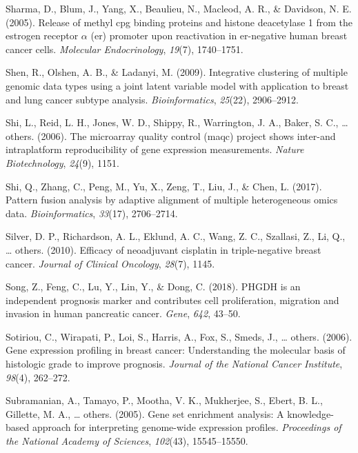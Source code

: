 \documentclass[12pt,twoside]{reedthesis}
\begin{document}
\leavevmode\hypertarget{ref-sharma2005release}{}%
Sharma, D., Blum, J., Yang, X., Beaulieu, N., Macleod, A. R., \& Davidson, N. E. (2005). Release of methyl cpg binding proteins and histone deacetylase 1 from the estrogen receptor \(\alpha\) (er) promoter upon reactivation in er-negative human breast cancer cells. \emph{Molecular Endocrinology}, \emph{19}(7), 1740--1751.

\leavevmode\hypertarget{ref-shen2009integrative}{}%
Shen, R., Olshen, A. B., \& Ladanyi, M. (2009). Integrative clustering of multiple genomic data types using a joint latent variable model with application to breast and lung cancer subtype analysis. \emph{Bioinformatics}, \emph{25}(22), 2906--2912.

\leavevmode\hypertarget{ref-shi2006microarray}{}%
Shi, L., Reid, L. H., Jones, W. D., Shippy, R., Warrington, J. A., Baker, S. C., \ldots{} others. (2006). The microarray quality control (maqc) project shows inter-and intraplatform reproducibility of gene expression measurements. \emph{Nature Biotechnology}, \emph{24}(9), 1151.

\leavevmode\hypertarget{ref-shi2017pattern}{}%
Shi, Q., Zhang, C., Peng, M., Yu, X., Zeng, T., Liu, J., \& Chen, L. (2017). Pattern fusion analysis by adaptive alignment of multiple heterogeneous omics data. \emph{Bioinformatics}, \emph{33}(17), 2706--2714.

\leavevmode\hypertarget{ref-silver2010efficacy}{}%
Silver, D. P., Richardson, A. L., Eklund, A. C., Wang, Z. C., Szallasi, Z., Li, Q., \ldots{} others. (2010). Efficacy of neoadjuvant cisplatin in triple-negative breast cancer. \emph{Journal of Clinical Oncology}, \emph{28}(7), 1145.

\leavevmode\hypertarget{ref-song2018phgdh}{}%
Song, Z., Feng, C., Lu, Y., Lin, Y., \& Dong, C. (2018). PHGDH is an independent prognosis marker and contributes cell proliferation, migration and invasion in human pancreatic cancer. \emph{Gene}, \emph{642}, 43--50.

\leavevmode\hypertarget{ref-sotiriou2006gene}{}%
Sotiriou, C., Wirapati, P., Loi, S., Harris, A., Fox, S., Smeds, J., \ldots{} others. (2006). Gene expression profiling in breast cancer: Understanding the molecular basis of histologic grade to improve prognosis. \emph{Journal of the National Cancer Institute}, \emph{98}(4), 262--272.

\leavevmode\hypertarget{ref-subramanian2005gene}{}%
Subramanian, A., Tamayo, P., Mootha, V. K., Mukherjee, S., Ebert, B. L., Gillette, M. A., \ldots{} others. (2005). Gene set enrichment analysis: A knowledge-based approach for interpreting genome-wide expression profiles. \emph{Proceedings of the National Academy of Sciences}, \emph{102}(43), 15545--15550.
\end{document}
